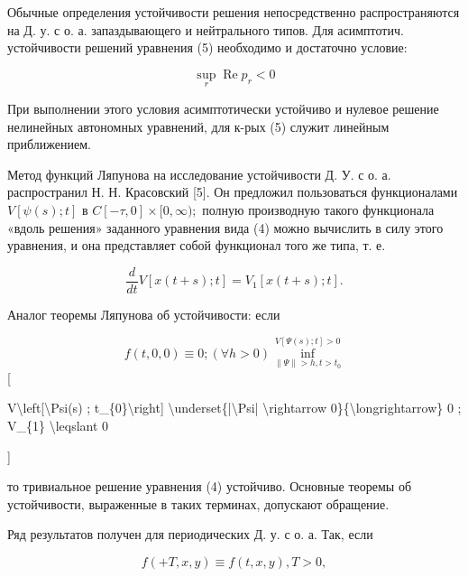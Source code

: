 \documentclass[10pt]{article}
\begin{document}
Обычные определения устойчивости решения непосредственно распространяются на Д. у. с о. а. запаздывающего и нейтрального типов. Для асимптотич. устойчивости решений уравнения (5) необходимо и достаточно условие:



\[

\sup _{r} \operatorname{Re} p_{r}<0

\]



При выполнении этого условия асимптотически устойчиво и нулевое решение нелинейных автономных уравнений, для к-рых (5) служит линейным приближением.



Метод функций Ляпунова на исследование устойчивости Д. У. с о. а. распространил Н. Н. Красовский [5]. Он предложил пользоваться функционалами $V[\psi(s) ; t]$ в $C[-\tau, 0] \times[0, \infty) ;$ полную производную такого функционала «вдоль решения» заданного уравнения вида (4) можно вычислить в силу этого уравнения, и она представляет собой функционал того же типа, т. е.



\[

\frac{d}{d t} V[x(t+s) ; t]=V_{1}[x(t+s) ; t] .

\]



Аналог теоремы Ляпунова об устойчивости: если



\[

f(t, 0,0) \equiv 0 ;(\forall h>0) \inf _{\|\Psi\|>h, t>t_{0}}^{V[\Psi(s) ; t]>0}

\][



V\textbackslash left[\textbackslash Psi(s) ; t\_\{0\}\textbackslash right] \textbackslash underset\{|\textbackslash Psi| \textbackslash rightarrow 0\}\{\textbackslash longrightarrow\} 0 ; V\_\{1\} \textbackslash leqslant 0

]



то тривиальное решение уравнения (4) устойчиво. Основные теоремы об устойчивости, выраженные в таких терминах, допускают обращение.



Ряд результатов получен для периодических Д. у. с о. а. Так, если



\[

f(+T, x, y) \equiv f(t, x, y), T>0,

\]
\end{document}
